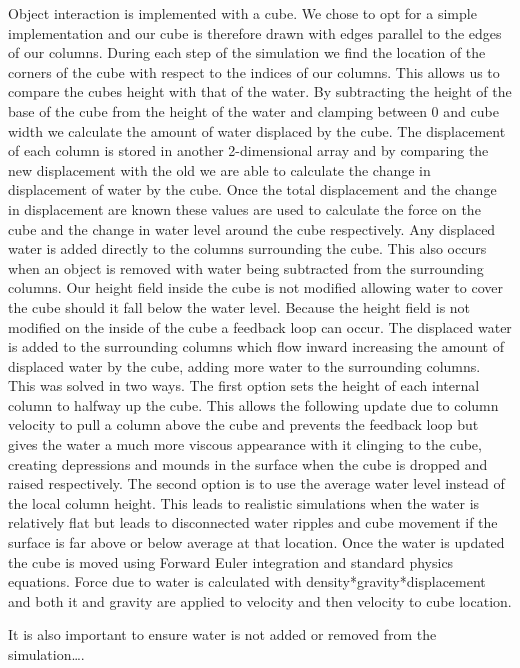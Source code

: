 \documentclass[12pt,titlepage]{article}
\begin{document}
Object interaction is implemented with a cube.  We chose to opt for a simple implementation and our cube is therefore drawn with edges parallel to the edges of our columns.  During each step of the simulation we find the location of the corners of the cube with respect to the indices of our columns.  This allows us to compare the cubes height with that of the water.  By subtracting the height of the base of the cube from the height of the water and clamping between 0 and cube width we calculate the amount of water displaced by the cube.  The displacement of each column is stored in another 2-dimensional array and by comparing the new displacement with the old we are able to calculate the change in displacement of water by the cube.  Once the total displacement and the change in displacement are known these values are used to calculate the force on the cube and the change in water level around the cube respectively.  Any displaced water is added directly to the columns surrounding the cube.  This also occurs when an object is removed with water being subtracted from the surrounding columns.  Our height field inside the cube is not modified allowing water to cover the cube should it fall below the water level.  Because the height field is not modified on the inside of the cube a feedback loop can occur.  The displaced water is added to the surrounding columns which flow inward increasing the amount of displaced water by the cube, adding more water to the surrounding columns.  This was solved in two ways.  The first option sets the height of each internal column to halfway up the cube.  This allows the following update due to column velocity to pull a column above the cube and prevents the feedback loop but gives the water a much more viscous appearance with it clinging to the cube, creating depressions and mounds in the surface when the cube is dropped and raised respectively.  The second option is to use the average water level instead of the local column height.  This leads to realistic simulations when the water is relatively flat but leads to disconnected water ripples and cube movement if the surface is far above or below average at that location.  Once the water is updated the cube is moved using Forward Euler integration and standard physics equations.  Force due to water is calculated with density*gravity*displacement and both it and gravity are applied to velocity and then velocity to cube location.


It is also important to ensure water is not added or removed from the simulation….
\end{document}
